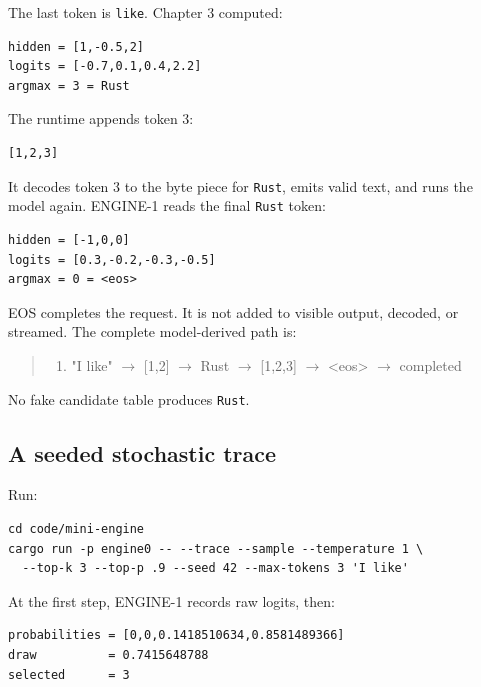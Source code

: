 The last token is \texttt{like}. Chapter 3 computed:

\begin{verbatim}
hidden = [1,-0.5,2]
logits = [-0.7,0.1,0.4,2.2]
argmax = 3 = Rust
\end{verbatim}

The runtime appends token 3:

\begin{verbatim}
[1,2,3]
\end{verbatim}

It decodes token 3 to the byte piece for \texttt{Rust}, emits valid
text, and runs the model again. ENGINE-1 reads the final \texttt{Rust}
token:

\begin{verbatim}
hidden = [-1,0,0]
logits = [0.3,-0.2,-0.3,-0.5]
argmax = 0 = <eos>
\end{verbatim}

EOS completes the request. It is not added to visible output, decoded,
or streamed. The complete model-derived path is:

\begin{quote}
\begin{enumerate}
\item "I like"  \(\longrightarrow\)  [1,2]  \(\longrightarrow\)  Rust  \(\longrightarrow\)  [1,2,3]  \(\longrightarrow\)  <eos>  \(\longrightarrow\)  completed
\end{enumerate}
\end{quote}

No fake candidate table produces \texttt{Rust}.

\subsection{A seeded stochastic
trace}\label{a-seeded-stochastic-trace}

Run:

\begin{verbatim}
cd code/mini-engine
cargo run -p engine0 -- --trace --sample --temperature 1 \
  --top-k 3 --top-p .9 --seed 42 --max-tokens 3 'I like'
\end{verbatim}

At the first step, ENGINE-1 records raw logits, then:

\begin{verbatim}
probabilities = [0,0,0.1418510634,0.8581489366]
draw          = 0.7415648788
selected      = 3
\end{verbatim}

